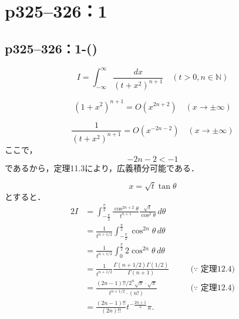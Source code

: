 



\section*{p325--326：1}


\subsection*{p325--326：1-()}

\begin{tanswer}
    \[
        I = \int_{-\infty}^{\infty} \frac{dx}{(t+x^2)^{n+1}} \quad (t > 0, n \in \mathbb{N})
    \]

    \[
        (1+x^2)^{n+1} = O(x^{2n+2}) \quad (x \to \pm \infty)
    \]

    \[
        \frac{1}{(t+x^2)^{n+1}} = O(x^{-2n-2}) \quad (x \to \pm \infty)
    \]
    ここで，
    \[
        -2n-2 < -1
    \]
    であるから，定理11.3により，広義積分可能である．

    \[
        x = \sqrt{t} \tan \theta
    \]
    とすると．
    \begin{alignat*}{2}
        I & = \int_{-\frac{\pi}{2}}^{\frac{\pi}{2}} \frac{\cos^{2n+2} \theta}{t^{n+1} } \frac{\sqrt{t}}{\cos^2 \theta} \, d \theta &       &                            \\
          & = \frac{1}{t^{n+1/2}} \int_{-\frac{\pi}{2}}^{\frac{\pi}{2}} \cos^{2n} \theta \, d\theta                                &       &                            \\
          & = \frac{1}{t^{n+1/2}} \int_{0}^{\frac{\pi}{2}} 2 \cos^{2n} \theta \, d\theta                                           &       &                            \\
          & = \frac{1}{t^{n+1/2}} \frac{\Gamma (n+1/2) \Gamma (1/2)}{\Gamma(n+1)}                                                  & \quad & \text{($\because$~定理12.4)} \\
          & = \frac{(2n-1)!! / 2^n \sqrt{\pi} \cdot \sqrt{\pi}}{t^{n+1/2} \cdot (n!)}                                              & \quad & \text{($\because$~定理12.4)} \\\
          & = \frac{(2n-1)!!}{(2n)!!} t^{ - \frac{2n+1}{2}} \pi .
    \end{alignat*}
\end{tanswer}





